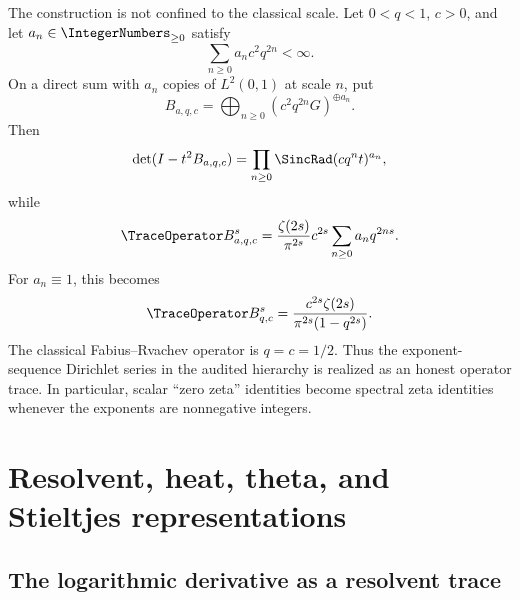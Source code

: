 \documentclass[11pt]{article}
\theoremstyle{definition}
\theoremstyle{remark}
\begin{document}
The construction is not confined to the classical scale.  Let \(0<q<1\), \(c>0\), and
let \(a_n\in\IntegerNumbers_{\ge0}\) satisfy
\begin{equation}
 \sum_{n\ge0}a_n c^2q^{2n}<\infty.
 \label{p4:eq:exp-summability}
\end{equation}
On a direct sum with \(a_n\) copies of \(L^2(0,1)\) at scale \(n\), put
\begin{equation}
 B_{a,q,c}=\bigoplus_{n\ge0}
 \left(c^2q^{2n}G\right)^{\oplus a_n}.
 \label{p4:eq:general-B}
\end{equation}
Then
\begin{equation}
 \det(I-t^2B_{a,q,c})
 =\prod_{n\ge0}\SincRad(cq^nt)^{a_n},
 \label{p4:eq:general-det}
\end{equation}
while
\begin{equation}
 \TraceOperator B_{a,q,c}^{s}
 =\frac{\zeta(2s)}{\pi^{2s}}c^{2s}
 \sum_{n\ge0}a_nq^{2ns}.
 \label{p4:eq:general-zeta}
\end{equation}
For \(a_n\equiv1\), this becomes
\begin{equation}
 \TraceOperator B_{q,c}^{s}
 =\frac{c^{2s}\zeta(2s)}{\pi^{2s}(1-q^{2s})}.
 \label{p4:eq:q-geometric-zeta}
\end{equation}
The classical Fabius--Rvachev operator is \(q=c=1/2\).  Thus the exponent-sequence
Dirichlet series in the audited hierarchy is realized as an honest operator trace.  In
particular, scalar ``zero zeta'' identities become spectral zeta identities whenever
the exponents are nonnegative integers.

\section{Resolvent, heat, theta, and Stieltjes representations}
\label{p4:sec:heat}

\subsection{The logarithmic derivative as a resolvent trace}
\end{document}
